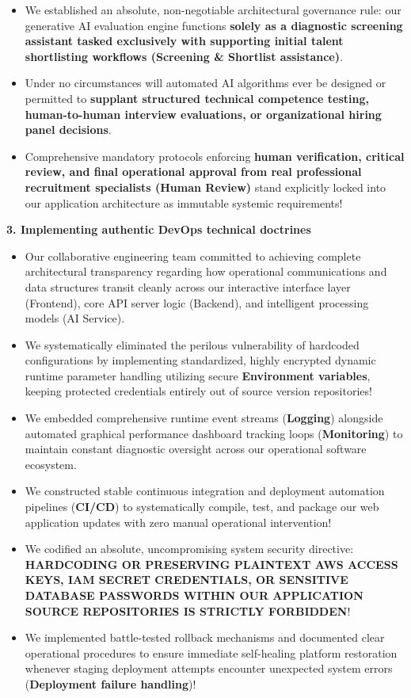 \begin{itemize}
\tightlist
\item
  We established an absolute, non-negotiable architectural governance
  rule: our generative AI evaluation engine functions \textbf{solely as
  a diagnostic screening assistant tasked exclusively with supporting
  initial talent shortlisting workflows (Screening \& Shortlist
  assistance)}.
\item
  Under no circumstances will automated AI algorithms ever be designed
  or permitted to \textbf{supplant structured technical competence
  testing, human-to-human interview evaluations, or organizational
  hiring panel decisions}.
\item
  Comprehensive mandatory protocols enforcing \textbf{human
  verification, critical review, and final operational approval from
  real professional recruitment specialists (Human Review)} stand
  explicitly locked into our application architecture as immutable
  systemic requirements!
\end{itemize}

\vspace{0.5em}\noindent\textbf{3. Implementing authentic DevOps technical
doctrines}\par

\begin{itemize}
\tightlist
\item
  Our collaborative engineering team committed to achieving complete
  architectural transparency regarding how operational communications
  and data structures transit cleanly across our interactive interface
  layer (Frontend), core API server logic (Backend), and intelligent
  processing models (AI Service).
\item
  We systematically eliminated the perilous vulnerability of hardcoded
  configurations by implementing standardized, highly encrypted dynamic
  runtime parameter handling utilizing secure \textbf{Environment
  variables}, keeping protected credentials entirely out of source
  version repositories!
\item
  We embedded comprehensive runtime event streams (\textbf{Logging})
  alongside automated graphical performance dashboard tracking loops
  (\textbf{Monitoring}) to maintain constant diagnostic oversight across
  our operational software ecosystem.
\item
  We constructed stable continuous integration and deployment automation
  pipelines (\textbf{CI/CD}) to systematically compile, test, and
  package our web application updates with zero manual operational
  intervention!
\item
  We codified an absolute, uncompromising system security directive:
  \textbf{HARDCODING OR PRESERVING PLAINTEXT AWS ACCESS KEYS, IAM SECRET
  CREDENTIALS, OR SENSITIVE DATABASE PASSWORDS WITHIN OUR APPLICATION
  SOURCE REPOSITORIES IS STRICTLY FORBIDDEN}!
\item
  We implemented battle-tested rollback mechanisms and documented clear
  operational procedures to ensure immediate self-healing platform
  restoration whenever staging deployment attempts encounter unexpected
  system errors (\textbf{Deployment failure handling})!
\end{itemize}

